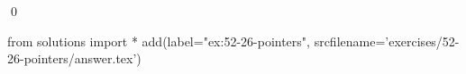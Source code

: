 
\begin{ex}
  \label{ex:52-26-pointers}
  
  \qed
\end{ex}
\begin{python0}
from solutions import *
add(label="ex:52-26-pointers",
    srcfilename='exercises/52-26-pointers/answer.tex')
\end{python0}
